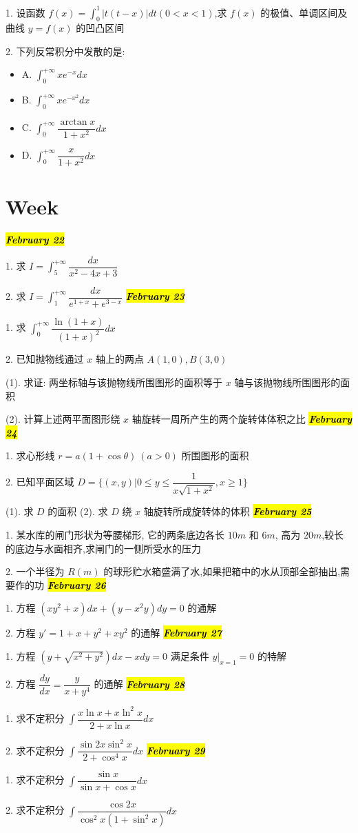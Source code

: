 1. 设函数 $f(x)=\int_{0}^{1}|t(t-x)|dt(0<x<1)$,求 $f(x)$ 的极值、单调区间及曲线 $y=f(x)$ 的凹凸区间

2. 下列反常积分中发散的是:
\begin{itemize}
	\item A. $\int_{0}^{+\infty}xe^{-x}dx$
	\item B. $\int_{0}^{+\infty}xe^{-x^{2}}dx$
	\item C. $\int_{0}^{+\infty}\dfrac{\arctan x}{1+x^{2}}dx$
	\item D. $\int_{0}^{+\infty}\dfrac{x}{1+x^{2}}dx$
\end{itemize}
\section{Week }
\hl{\textbf{\textit{February 22}}}

1. 求 $I=\int_{5}^{+\infty}\dfrac{dx}{x^{2}-4x+3}$

2. 求 $I=\int_{1}^{+\infty}\dfrac{dx}{e^{1+x}+e^{3-x}}$
\hl{\textbf{\textit{February 23}}}

1. 求 $\int_{0}^{+\infty}\dfrac{\ln(1+x)}{(1+x)^{2}}dx$

2. 已知抛物线通过 $x$ 轴上的两点 $A(1,0),B(3,0)$

(1). 求证: 两坐标轴与该抛物线所围图形的面积等于 $x$ 轴与该抛物线所围图形的面积

(2). 计算上述两平面图形绕 $x$ 轴旋转一周所产生的两个旋转体体积之比
\hl{\textbf{\textit{February 24}}}

1. 求心形线 $r=a(1+\cos\theta)\ (a>0)$ 所围图形的面积

2. 已知平面区域 $D=\{(x,y)|0\leq y\leq \dfrac{1}{x\sqrt{1+x^{2}}},x\geq 1\}$

(1). 求 $D$ 的面积
(2). 求 $D$ 绕 $x$ 轴旋转所成旋转体的体积
\hl{\textbf{\textit{February 25}}}

1. 某水库的闸门形状为等腰梯形, 它的两条底边各长 $10m$ 和 $6m$, 高为 $20m$,较长的底边与水面相齐,求闸门的一侧所受水的压力

2. 一个半径为 $R(m)$ 的球形贮水箱盛满了水,如果把箱中的水从顶部全部抽出,需要作的功
\hl{\textbf{\textit{February 26}}}

1. 方程 $(xy^{2}+x)dx+(y-x^{2}y)dy=0$ 的通解

2. 方程 $y'=1+x+y^{2}+xy^{2}$ 的通解
\hl{\textbf{\textit{February 27}}}

1. 方程 $(y+\sqrt{x^{2}+y^{2}})dx-xdy=0$ 满足条件 $y|_{x=1}=0$ 的特解

2. 方程 $\dfrac{dy}{dx}=\dfrac{y}{x+y^{4}}$ 的通解
\hl{\textbf{\textit{February 28}}}

1. 求不定积分 $\int\dfrac{x\ln x+x\ln^{2}x}{2+x\ln x}dx$

2. 求不定积分 $\int\dfrac{\sin 2x\sin^{2}x}{2+\cos^{4} x}dx$
\hl{\textbf{\textit{February 29}}}

1. 求不定积分 $\int\dfrac{\sin x}{\sin x+\cos x}dx$

2. 求不定积分 $\int\dfrac{\cos 2x}{\cos^{2} x(1+\sin^{2} x)}dx$
